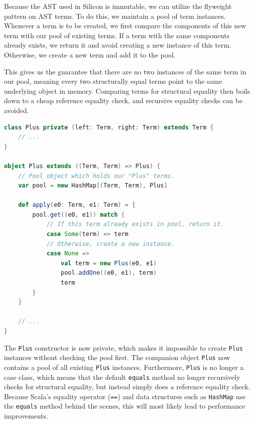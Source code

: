 \documentclass[11pt]{article}
\begin{document}
    Because the AST used in Silicon is immutable, we can utilize the flyweight pattern \cite{patterns} on AST terms.
    To do this, we maintain a pool of term instances. Whenever a term
    is to be created, we first compare the components of this new term with our
    pool of existing terms. If a term with the same components already exists, we return it and
    avoid creating a new instance of this term. Otherwise, we create a new term and add it to
    the pool.

    This gives us the guarantee that there are no two instances of the
    same term in our pool, meaning every two structurally equal terms point to the same
    underlying object in memory. Comparing terms for structural equality then boils
    down to a cheap reference equality check, and recursive equality checks can be avoided.
    
    \begin{lstlisting}[language=Scala, caption=Avoid instantiating multiple structurally equal terms using the flyweight pattern.]
class Plus private (left: Term, right: Term) extends Term {
    // ...
}

object Plus extends ((Term, Term) => Plus) {
    // Pool object which holds our "Plus" terms.
    var pool = new HashMap[(Term, Term), Plus]

    def apply(e0: Term, e1: Term) = {
        pool.get((e0, e1)) match {
            // If this term already exists in pool, return it. 
            case Some(term) => term
            // Otherwise, create a new instance.
            case None =>
                val term = new Plus(e0, e1)
                pool.addOne((e0, e1), term)
                term
        }
    }

    // ...
}
    \end{lstlisting}

    The \texttt{Plus} constructor is now private, which makes it impossible to
    create \texttt{Plus} instances without checking the pool first. The companion
    object \texttt{Plus} now contains a pool of all existing \texttt{Plus} instances. Furthermore,
    \texttt{Plus} is no longer a case class, which means that the default \texttt{equals}
    method no longer recursively checks for structural equality, but instead
    simply does a reference equality check. Because Scala's equality operator (\texttt{==})
    and data structures such as \texttt{HashMap} use the \texttt{equals} method behind
    the scenes, this will most likely lead to performance improvements.
\end{document}
